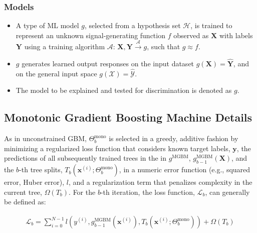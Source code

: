 \documentclass[information,article,submit,moreauthors,pdftex]{definitions/mdpi}
\begin{document}
\subsubsection{Models}

\begin{itemize}[leftmargin=*,labelsep=5.8mm]
	\item A type of ML model $g$, selected from a hypothesis set $\mathcal{H}$, is trained to represent an unknown signal-generating function $f$ observed as  $\mathbf{X}$ with labels $\mathbf{Y}$ using a training algorithm $\mathcal{A}$: 
	$ \mathbf{X}, \mathbf{Y} \xrightarrow{\mathcal{A}} g$, such that $g \approx f$.
	\item $g$ generates learned output responses on the input dataset $g(\mathbf{X}) = \mathbf{\hat{Y}}$, and on the general input space $g(\mathcal{X}) = \mathcal{\hat{Y}}$.
	\item The model to be explained and tested for discrimination is denoted as $g$.
\end{itemize}

\subsection{Monotonic Gradient Boosting Machine Details}\label{a_ssec:mgbm}

\noindent As in unconstrained GBM, $\Theta^{\text{mono}}_b$ is selected in a greedy, additive fashion by minimizing a regularized loss function that considers known target labels, $\mathbf{y}$, the predictions of all subsequently trained trees in the in $g^{\text{MGBM}}$, $g^{\text{MGBM}}_{b-1}(\mathbf{X})$, and the $b$-th tree splits, $T_b(\mathbf{x}^{(i)};\Theta^\text{mono}_b)$, in a numeric error function (e.g., squared error, Huber error), $l$, and a regularization term that penalizes complexity in the current tree, $\Omega(T_b)$. For the $b$-th iteration, the loss function, $\mathcal{L}_{b}$, can generally be defined as:

\begin{equation}
\begin{aligned}
\mathcal{L}_{b} =\sum_{i=0}^{N-1}l(y^{(i)}, g^{\text{MGBM}}_{b-1}(\mathbf{x}^{(i)}), T_b(\mathbf{x}^{(i)};\Theta^\text{mono}_b)) + \Omega(T_b)\\
\end{aligned}
\end{equation}
\end{document}

